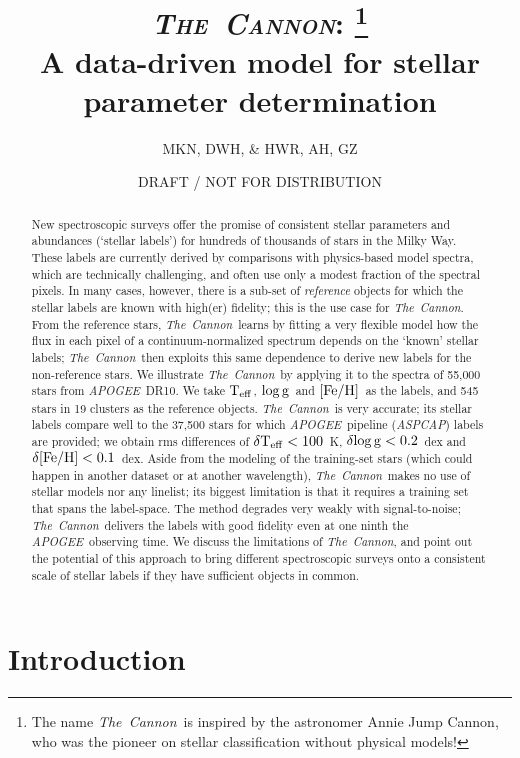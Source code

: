 \documentclass[12pt, preprint]{aastex}
\newcommand{\teff}{\mbox{$\rm T_{eff}$}}
\newcommand{\feh}{\mbox{$\rm [Fe/H]$}}
\newcommand{\logg}{\mbox{$\rm \log g$}}
\newcommand{\tc}{\textsl{The~Cannon}}
\newcommand{\apogee}{\textsl{APOGEE}}
\newcommand{\aspcap}{\textsl{ASPCAP}}
\begin{document}
\title{\textsc{\tc: \footnote{The name \tc\ is inspired by the astronomer Annie Jump Cannon,
who was the pioneer on stellar classification without physical models!}}\\ A data-driven model for stellar parameter determination}
\author{
  MKN,
  DWH,
  \&
  HWR,
  AH, GZ} 
\date{DRAFT / NOT FOR DISTRIBUTION}



\begin{abstract}%
New spectroscopic surveys offer the promise of consistent stellar
parameters and abundances (`stellar labels') for hundreds of thousands
of stars in the Milky Way. 
These labels are currently derived by comparisons with physics-based
model spectra, which are technically challenging, and often use only a
modest fraction of the spectral pixels. 
In many cases, however, there is a sub-set of \emph{reference}
objects for which the stellar labels are known with high(er)
fidelity; this is the use case for \tc.
From the reference stars, \tc\ learns by fitting a very flexible
model how the flux in each pixel of a continuum-normalized spectrum
depends on the `known' stellar labels; \tc\ then exploits this same
dependence to derive new labels for the non-reference stars.
We illustrate \tc\ by applying it to the spectra of 55,000 stars from
\apogee\ DR10. 
We take \teff, \logg\ and \feh\ as the labels, and 545 stars in 19
clusters as the reference objects. 
\tc\ is very accurate; its stellar labels compare well to the 37,500
stars for which \apogee\ pipeline (\aspcap) labels are provided; we
obtain rms differences of $\delta\teff< 100$~K, $\delta\logg< 0.2$~dex
and $\delta\feh< 0.1$~dex.
Aside from the modeling of the training-set stars (which could happen
in another dataset or at another wavelength), \tc\ makes no use of
stellar models nor any linelist; its biggest limitation is that it
requires a training set that spans the label-space. 
The method degrades very weakly with signal-to-noise; \tc\ delivers
the labels with good fidelity even at one ninth the
\apogee\ observing time. 
We discuss the limitations of \tc, and point out the potential of this
approach to bring different spectroscopic surveys onto a consistent
scale of stellar labels if they have sufficient objects in common.
\end{abstract}


\section{Introduction}
\end{document}
